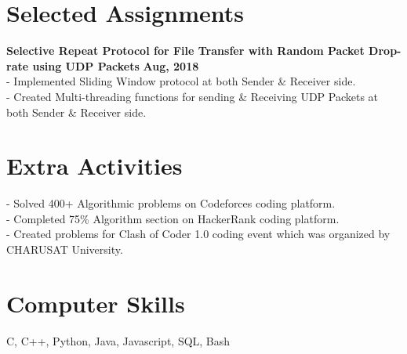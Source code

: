 \documentclass[margin,line]{res}
\begin{document}
\begin{resume}
\section{\sc Selected Assignments}
{\bf Selective Repeat Protocol for File Transfer with Random Packet Drop-rate using UDP Packets}
\hfill {\bf Aug, 2018}\\
- Implemented Sliding Window protocol at both Sender \& Receiver side.\\
- Created Multi-threading functions for sending \& Receiving UDP Packets at both Sender \& Receiver side.

\section{\sc Extra Activities} 
- Solved 400+ Algorithmic problems on Codeforces coding platform.\\
- Completed 75\% Algorithm section on HackerRank coding platform. \\
- Created problems for Clash of Coder 1.0 coding event which was organized by CHARUSAT University.

\section{\sc Computer Skills} 
C, C++, Python, Java, Javascript, SQL, Bash

\end{resume}
\end{document}

